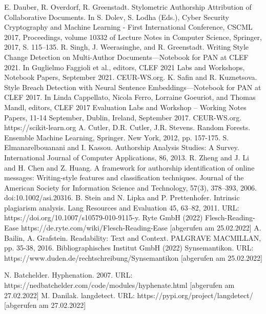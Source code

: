\documentclass[conference]{IEEEtran}
\begin{document}
\begin{thebibliography}{00}
	 E. Dauber, R. Overdorf, R. Greenstadt. Stylometric Authorship Attribution of Collaborative Documents. In S. Dolev, S. Lodha (Eds.), Cyber Security Cryptography and Machine Learning - First International Conference, CSCML 2017, Proceedings, volume 10332 of Lecture Notes in Computer Science, Springer, 2017, S. 115–135.
	 R. Singh, J. Weerasinghe, and R. Greenstadt. Writing Style Change Detection on Multi-Author Documents—Notebook for PAN at CLEF 2021. In Guglielmo Faggioli et al., editors, CLEF 2021 Labs and Workshops, Notebook Papers, September 2021. CEUR-WS.org.
	 K. Safin and R. Kuznetsova. Style Breach Detection with Neural Sentence Embeddings—Notebook for PAN at CLEF 2017. In Linda Cappellato, Nicola Ferro, Lorraine Goeuriot, and Thomas Mandl, editors, CLEF 2017 Evaluation Labs and Workshop – Working Notes Papers, 11-14 September, Dublin, Ireland, September 2017. CEUR-WS.org.
	 https://scikit-learn.org
	 A. Cutler, D.R. Cutler, J.R. Stevens. Random Forests. Ensemble Machine Learning, Springer. New York, 2012, pp. 157-175.
	 S. Elmanarelbouanani and I. Kassou. Authorship Analysis Studies: A Survey. International Journal of Computer Applications, 86, 2013.
	 R. Zheng and J. Li and H. Chen and Z. Huang. A framework for authorship identification of online messages: Writing-style features and classification techniques. Journal of the American Society for Information Science and Technology, 57(3), 378–393, 2006. doi:10.1002/asi.20316.
	 B. Stein and N. Lipka and P. Prettenhofer. Intrinsic plagiarism analysis. Lang Resources and Evaluation 45, 63–82, 2011. URL: https://doi.org/10.1007/s10579-010-9115-y.
	 Ryte GmbH (2022) Flesch-Reading-Ease  https://de.ryte.com/wiki/Flesch-Reading-Ease [abgerufen am 25.02.2022]
	 A. Bailin, A. Grafstein. Readability: Text and Context. PALGRAVE MACMILLAN,  pp. 35-38, 2016.
	 Bibliographisches Institut GmbH (2022) Synsemantikon. URL: https://www.duden.de/rechtschreibung/Synsemantikon [abgerufen am 25.02.2022]
	
	 N. Batchelder. Hyphenation. 2007. URL: https://nedbatchelder.com/code/modules/hyphenate.html [abgerufen am 27.02.2022]
	 M. Danilak. langdetect. URL: https://pypi.org/project/langdetect/ [abgerufen am 27.02.2022]
	
\end{thebibliography}
\end{document}
